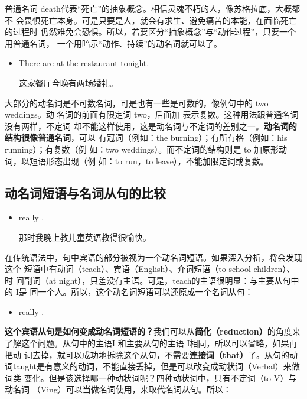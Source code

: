 普通名词 death代表“死亡”的抽象概念。相信灵魂不朽的人，像苏格拉底，大概都不
会畏惧死亡本身。可是只要是人，就会有求生、避免痛苦的本能，在面临死亡的过程时
仍然难免会恐惧。所以，若要区分“抽象概念”与“动作过程”，只要一个用普通名词，
一个用暗示“动作、持续”的动名词就可以了。

\begin{itemize}
\item  There are  at the restaurant tonight.

这家餐厅今晚有两场婚礼。
\end{itemize}

大部分的动名词是不可数名词，可是也有一些是可数的，像例句中的 two weddings。动
名词的前面有限定词 two，后面加 表示复数。这种用法跟普通名词没有两样，不定词
却不能这样使用，这是动名词与不定词的差别之一。\textbf{动名词的结构很像普通名词}，可以
有冠词（例如：the burning）；有所有格（例如：his running）；有复数（例
如：two weddings）。而不定词的结构则是 to 加原形动词，以短语形态出现（例
如：to run，to leave），不能加限定词或复数。

\subsection{动名词短语与名词从句的比较}

\begin{itemize}
\item  {} really  .

  那时我晚上教儿童英语教得很愉快。
\end{itemize}

在传统语法中，句中宾语的部分被视为一个动名词短语。如果深入分析，将会发现这个
短语中有动词（teach）、宾语（English）、介词短语（to school children）、时
间副词（at night），只差没有主语。可是，teach的主语很明显：与主要从句中的 I是
同一个人。所以，这个动名词短语可以还原成一个名词从句：

\begin{itemize}
\item {} really  .
\end{itemize}

\textbf{这个宾语从句是如何变成动名词短语的？}我们可以从\textbf{简化（reduction）}的角度来
了解这个问题。从句中的主语I 和主要从句的主语 I相同，所以可以省略，如果再把动
词去掉，就可以成功地拆除这个从句，不需要\textbf{连接词（that）}了。从句的动
词taught是有意义的动词，不能直接丢掉，但是可以改变成动状词（Verbal）来做词类
变化。但是该选择哪一种动状词呢？四种动状词中，只有不定词（to V）与动名词
（Ving）可以当做名词使用，来取代名词从句。所以：

